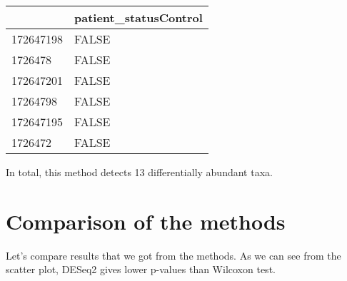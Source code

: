 \documentclass[
  oneside]{book}
\newenvironment{Shaded}{\begin{snugshade}}{\end{snugshade}}
\newcommand{\AttributeTok}[1]{\textcolor[rgb]{0.77,0.63,0.00}{#1}}
\newcommand{\DecValTok}[1]{\textcolor[rgb]{0.00,0.00,0.81}{#1}}
\newcommand{\FunctionTok}[1]{\textcolor[rgb]{0.00,0.00,0.00}{#1}}
\newcommand{\NormalTok}[1]{#1}
\newcommand{\OtherTok}[1]{\textcolor[rgb]{0.56,0.35,0.01}{#1}}
\newcommand{\SpecialCharTok}[1]{\textcolor[rgb]{0.00,0.00,0.00}{#1}}
\newcommand{\StringTok}[1]{\textcolor[rgb]{0.31,0.60,0.02}{#1}}
\begin{document}
\begin{Shaded}
\end{Shaded}

\begin{table}
\centering
\begin{tabular}{l|l}
\hline
  & patient\_statusControl\\
\hline
172647198 & FALSE\\
\hline
1726478 & FALSE\\
\hline
172647201 & FALSE\\
\hline
17264798 & FALSE\\
\hline
172647195 & FALSE\\
\hline
1726472 & FALSE\\
\hline
\end{tabular}
\end{table}

In total, this method detects 13 differentially abundant taxa.

\hypertarget{comparison-of-the-methods}{%
\section{Comparison of the methods}\label{comparison-of-the-methods}}

Let's compare results that we got from the methods.
As we can see from the scatter plot, DESeq2 gives lower p-values than Wilcoxon test.

\begin{Shaded}
\end{Shaded}
\end{document}
